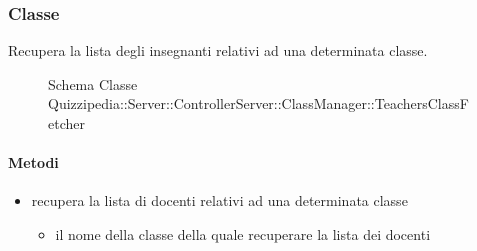 \subsubsection{Classe }
Recupera la lista degli insegnanti relativi ad una determinata classe.
\begin{figure}[H]
\centering
\noindent{}
\caption[Schema Classe TeachersClassFetcher]{Schema Classe Quizzipedia::Server::ControllerServer::ClassManager::TeachersClassFetcher}
\end{figure}
\paragraph{Metodi}
\begin{itemize}
\item {}
\newline
recupera la lista di docenti relativi ad una determinata classe
\newline
{}
\newline
\begin{itemize}
\item {}
\newline
il nome della classe della quale recuperare la lista dei docenti
\end{itemize}
\end{itemize}
